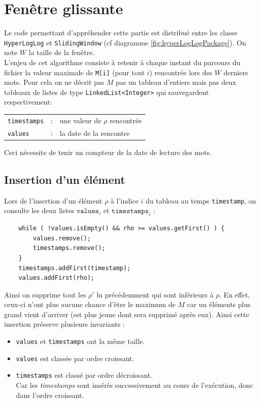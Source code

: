 \documentclass[12pt,a4paper,titlepage]{article}
\newcommand{\class}[1]{\texttt{#1}}
\begin{document}
\newpage
\section{Fenêtre glissante}
Le code permettant d'appréhender cette partie est distribué entre les classe \class{HyperLogLog} et \class{SlidingWindow} (cf diagramme \ref{fig:hyperLogLogPackage}).
On note $W$ la taille de la fenêtre.\\
L'enjeu de cet algorithme consiste à retenir à chaque instant du parcours du fichier la valeur maximale de \class{M[i]} (pour tout $i$) rencontrée lors des $W$ derniers mots. Pour cela on ne décrit pas $M$ pas un tableau d'entiers mais pas deux tableaux de listes de type \class{LinkedList<Integer>} qui sauvegardent respectivement:\\
\begin{tabular}{lcl}
\class{timestamps} &:& une valeur de $\rho$ rencontrée \\
\class{values} 	   &:& la date de la rencontre
\end{tabular}
Ceci nécessite de tenir un compteur de la date de lecture des mots.

\subsection{Insertion d'un élément}
Lors de l'insertion d'un élément $\rho$ à l'indice $i$ du tableau au temps \class{timestamp}, on consulte les deux listes $\class{values}_i$ et $\class{timestamps}_i$ :
\begin{lstlisting}
    while ( !values.isEmpty() && rho >= values.getFirst() ) {
    	values.remove();
    	timestamps.remove();
    }
    timestamps.addFirst(timestamp);
	values.addFirst(rho);
\end{lstlisting}
Ainsi on supprime tout les $\rho'$ lu précédemment qui sont inférieurs à $\rho$. En effet, ceux-ci n'ont plus aucune chance d'être le maximum de $M$ car un éléments plus grand vient d'arriver (est plus jeune dont sera supprimé après eux).
Ainsi cette insertion préserve plusieurs invariants :
\begin{itemize}
\item \class{values} et \class{timestamps} ont la même taille.
\item \class{values} est classée par ordre croissant.
\item \class{timestamps} est classé par ordre décroissant.\\
Car les \textit{timestamps} sont insérés successivement au cours de l'exécution, donc dans l'ordre croissant.
\end{itemize}
\end{document}
